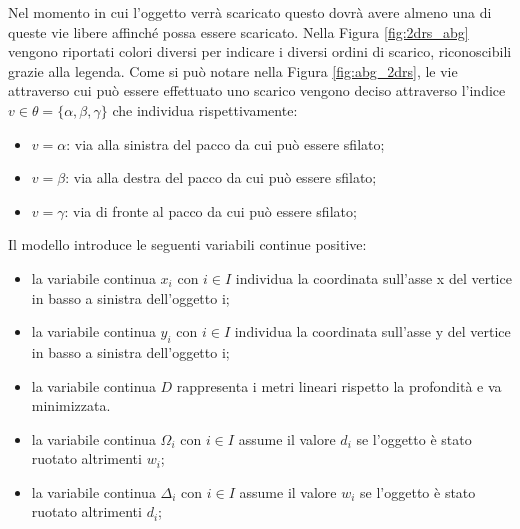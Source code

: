 Nel momento in cui l'oggetto verrà scaricato questo dovrà avere almeno una di queste vie libere affinché possa essere scaricato.
Nella Figura \ref{fig:2drs_abg} vengono riportati colori diversi per indicare i diversi ordini di scarico, riconoscibili grazie alla legenda.
Come si può notare nella Figura \ref{fig:abg_2drs}, le vie attraverso cui può essere effettuato uno scarico vengono deciso attraverso l'indice $v \in \theta = \{\alpha,\beta,\gamma\}$ che individua rispettivamente:
\begin{itemize}
	\item $v = \alpha$: via alla sinistra del pacco da cui può essere sfilato; 
	\item $v = \beta$: via alla destra del pacco da cui può essere sfilato; 
	\item $v = \gamma$: via di fronte al pacco da cui può essere sfilato; 
\end{itemize}

Il modello introduce le seguenti variabili continue positive:
\begin{itemize}
	\item la variabile continua $x_{i}$ con $i \in I$ individua la coordinata sull'asse x del vertice in basso a sinistra dell'oggetto i;
	\item la variabile continua $y_{i}$ con $i \in I$ individua la coordinata sull'asse y del vertice in basso a sinistra dell'oggetto i;
	\item la variabile continua $D$ rappresenta i metri lineari rispetto la profondità e va minimizzata.
	\item la variabile continua $\Omega_{i}$ con $i \in I$ assume il valore $d_i$ se l'oggetto è stato ruotato altrimenti $w_i$;
	\item la variabile continua $\Delta_{i}$ con $i \in I$ assume il valore $w_i$ se l'oggetto è stato ruotato altrimenti $d_i$;
\end{itemize}

